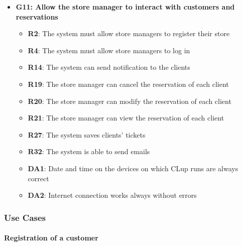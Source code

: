 \documentclass{article}
\begin{document}
\begin{itemize}
\begin{itemize}
					\end{itemize}

				\item {\bfseries G11: Allow the store manager to interact with customers and reservations}	

					\begin{itemize}
						\item {\bfseries R2}: The system must allow store managers to register their store
						\item {\bfseries R4}: The system must allow store managers to log in
						\item {\bfseries R14}: The system can send notification to the clients
						\item {\bfseries R19}: The store manager can cancel the reservation of each client
						\item {\bfseries R20}: The store manager can modify the reservation of each client
						\item {\bfseries R21}: The store manager can view the reservation of each client
						\item {\bfseries R27}: The system saves clients' tickets
						\item{\bfseries R32}: The system is able to send emails \\
		
						\item {\bfseries DA1}: Date and time on the devices on which CLup runs are always correct
						\item {\bfseries DA2}: Internet connection works always without errors
						\newpage
		
					\end{itemize}

			\end{itemize}

		\subsubsection{Use Cases}
		

			
			\paragraph{Registration of a customer}
			
\end{document}
